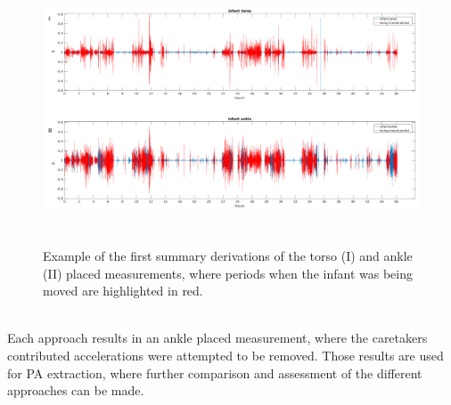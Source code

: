 \documentclass{article}
\begin{document}
{\begin{figure}[h]
\includegraphics[width=15cm, height=8cm]{example_approach_E.png}
\caption{Example of the first summary derivations of the torso (I) and ankle (II) placed measurements, where periods when the infant was being moved are highlighted in red.}
\end{figure}
\\Each approach results in an ankle placed measurement, where the caretakers contributed accelerations were attempted to be removed. Those results are used for PA extraction, where further comparison and assessment of the different approaches can be made.

}
\end{document}
